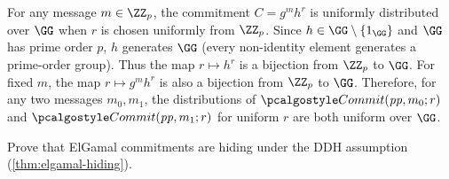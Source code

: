 \ifsolutions
\begin{mysolution}
  For any message $m \in \ZZ_p$, the commitment $C = g^m h^r$ is uniformly distributed over $\GG$ when $r$ is chosen uniformly from $\ZZ_p$.
  Since $h \in \GG \setminus \{1_\GG\}$ and $\GG$ has prime order $p$, $h$ generates $\GG$ (every non-identity element generates a prime-order group).
  Thus the map $r \mapsto h^r$ is a bijection from $\ZZ_p$ to $\GG$.
  For fixed $m$, the map $r \mapsto g^m h^r$ is also a bijection from $\ZZ_p$ to $\GG$.
  Therefore, for any two messages $m_0, m_1$, the distributions of $\algo{Commit}(\params, m_0; r)$ and $\algo{Commit}(\params, m_1; r)$ for uniform $r$ are both uniform over $\GG$.
\end{mysolution}
\fi

\begin{exercise}
  Prove that ElGamal commitments are hiding under the DDH assumption (\autoref{thm:elgamal-hiding}).
\end{exercise}

